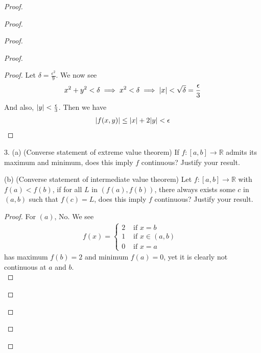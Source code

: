 \documentclass{report}
\begin{document}
\begin{proof}
\begin{proof}
\begin{proof}
\begin{proof}
\begin{proof}
Let $\delta=\frac{\epsilon ^2}{9}$. We now see 
\begin{align*}
x^2+y^2<\delta \implies x^2<\delta \implies |x|<\sqrt{\delta}=\frac{\epsilon}{3}
\end{align*}
And also, $|y|<\frac{\epsilon}{3}$. Then we have  
\begin{align*}
|f(x,y)|\leq |x|+2|y|<\epsilon 
\end{align*}
\end{proof}
\begin{question}{}{}
3. (a) (Converse statement of extreme value theorem)
If \( f : [a, b] \to \mathbb{R} \) admits its maximum and minimum, does this imply \( f \) continuous? Justify your result.

(b) (Converse statement of intermediate value theorem)
Let \( f : [a, b] \to \mathbb{R} \) with \( f(a) < f(b) \), if for all \( L \) in \( (f(a), f(b)) \), there always exists some \( c \) in \( (a, b) \) such that \( f(c) = L \), does this imply \( f \) continuous? Justify your result.
\end{question}
\begin{proof}
  For $(a)$, No. We see 
  \begin{align*}
  f(x)=\begin{cases}
    2& \text{ if $x=b$ }\\
    1& \text{ if $x\in (a,b)$ }\\
    0& \text{ if $x=a$ }
  \end{cases}
  \end{align*}
  has maximum $f(b)=2$ and minimum $f(a)=0$, yet it is clearly not continuous at $a$ and  $b$.\\


\end{proof}
\end{proof}
\end{proof}
\end{proof}
\end{proof}
\end{document}
